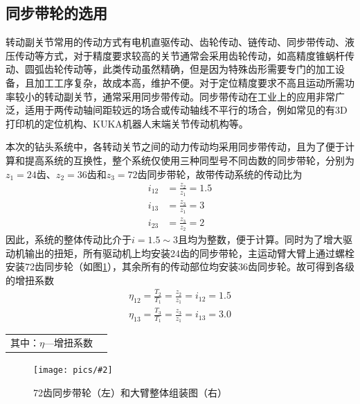\documentclass[UTF8]{article}%
\newcommand{\p}[4][0.5]{\begin{figure}[h]\centering\texttt{[image: pics/\#2]}\\\caption{#3}\label{#4}\end{figure}}%
\newcommand{\n}{\par}%
\begin{document}
\begin{spacing}{1.5}
	\subsection{同步带轮的选用}
	转动副关节常用的传动方式有电机直驱传动、齿轮传动、链传动、同步带传动、液压传动等方式，对于精度要求较高的关节通常会采用齿轮传动，如高精度锥蜗杆传动、圆弧齿轮传动等，此类传动虽然精确，但是因为特殊齿形需要专门的加工设备，且加工工序复杂，故成本高，维护不便。对于定位精度要求不高且运动所需功率较小的转动副关节，通常采用同步带传动。同步带传动在工业上的应用非常广泛，适用于两传动轴间距较远的场合或传动轴线不平行的场合，例如常见的有3D打印机的定位机构、KUKA机器人末端关节传动机构等。\n
	本次的钻头系统中，各转动关节之间的动力传动均采用同步带传动，且为了便于计算和提高系统的互换性，整个系统仅使用三种同型号不同齿数的同步带轮，分别为$z_1=24$齿、$z_2=36$齿和$z_3=72$齿同步带轮，故带传动系统的传动比为
	\begin{align*}
		i_{12}&=\frac{z_2}{z_1}=1.5\\ i_{13}&=\frac{z_3}{z_1}=3\\ i_{23}&=\frac{z_3}{z_2}=2
	\end{align*}
	因此，系统的整体传动比介于$i=1.5\sim3$且均为整数，便于计算。同时为了增大驱动机输出的扭矩，所有驱动机上均安装24齿的同步带轮，主运动臂大臂上通过螺栓安装72齿同步轮（如图\ref{dbzz}），其余所有的传动部位均安装36齿同步轮。故可得到各级的增扭系数
	\begin{align*}
		\eta_{12}=\frac{T_2}{T_1}=\frac{z_2}{z_1}=i_{12}=1.5\\
		\eta_{13}=\frac{T_3}{T_1}=\frac{z_3}{z_1}=i_{13}=3.0
	\end{align*}
	\begin{tabular}{cl}
		其中：$\eta$—增扭系数
	\end{tabular}\n
	\p[0.13]{72齿同步带轮（左）和大臂整体组装图（右）.PDF}{72齿同步带轮（左）和大臂整体组装图（右）}{dbzz}

\end{spacing}
\end{document}
